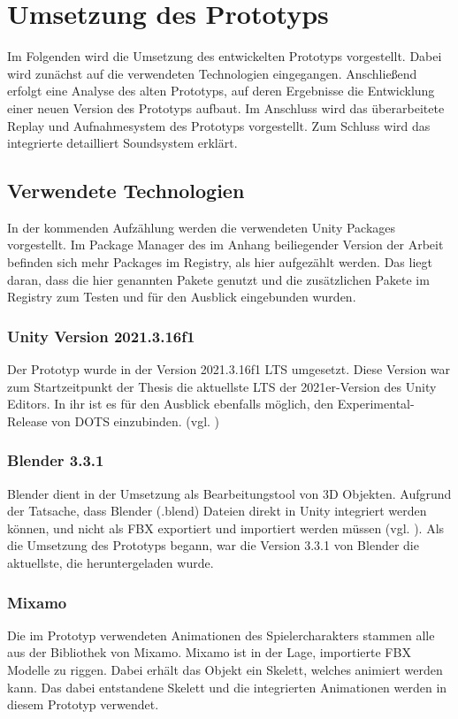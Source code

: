 \chapter{Umsetzung des Prototyps}\label{sec:dev}
Im Folgenden wird die Umsetzung des entwickelten Prototyps vorgestellt. Dabei wird zunächst auf die verwendeten Technologien eingegangen. Anschließend erfolgt eine Analyse des alten Prototyps, auf deren Ergebnisse die Entwicklung einer neuen Version des Prototyps aufbaut. Im Anschluss wird das überarbeitete Replay und Aufnahmesystem des Prototyps vorgestellt. Zum Schluss wird das integrierte detailliert Soundsystem erklärt.

\section{Verwendete Technologien}
In der kommenden Aufzählung werden die verwendeten Unity Packages vorgestellt. Im Package Manager des im Anhang beiliegender Version der Arbeit befinden sich mehr Packages im Registry, als hier aufgezählt werden. Das liegt daran, dass die hier genannten Pakete genutzt und die zusätzlichen Pakete im Registry zum Testen und für den Ausblick eingebunden wurden.

\subsection{Unity Version 2021.3.16f1}
Der Prototyp wurde in der Version 2021.3.16f1 \ac{LTS} umgesetzt. Diese Version war zum Startzeitpunkt der Thesis die aktuellste \ac{LTS} der 2021er-Version des Unity Editors. In ihr ist es für den Ausblick ebenfalls möglich, den Experimental-Release von \ac{DOTS} einzubinden. 
(vgl. \cite{noauthor_official_nodate})

\subsection{Blender 3.3.1}
Blender dient in der Umsetzung als Bearbeitungstool von \ac{3D} Objekten. Aufgrund der Tatsache, dass Blender (.blend) Dateien direkt in Unity integriert werden können, und nicht als \ac{FBX} exportiert und importiert werden müssen (vgl. \cite{technologies_unity_nodate}). Als die Umsetzung des Prototyps begann, war die Version 3.3.1 von Blender die aktuellste, die heruntergeladen wurde.

\subsection{Mixamo}
Die im Prototyp verwendeten Animationen des Spielercharakters stammen alle aus der Bibliothek von Mixamo. Mixamo ist in der Lage, importierte \ac{FBX} Modelle zu riggen. Dabei erhält das Objekt ein Skelett, welches animiert werden kann. Das dabei entstandene Skelett und die integrierten Animationen werden in diesem Prototyp verwendet.

